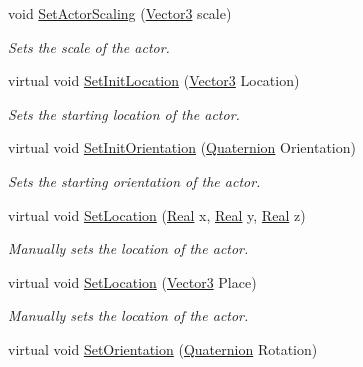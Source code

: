 \begin{DoxyCompactItemize}
void \hyperlink{classphys_1_1ActorSoft_ad1696a10b3057897ca503de013aaddc6}{SetActorScaling} (\hyperlink{classphys_1_1Vector3}{Vector3} scale)
\begin{DoxyCompactList}\small\item\em Sets the scale of the actor. \item\end{DoxyCompactList}\item 
virtual void \hyperlink{classphys_1_1ActorSoft_abbb6f5cce15d4efee91acd4825c75801}{SetInitLocation} (\hyperlink{classphys_1_1Vector3}{Vector3} Location)
\begin{DoxyCompactList}\small\item\em Sets the starting location of the actor. \item\end{DoxyCompactList}\item 
virtual void \hyperlink{classphys_1_1ActorSoft_adde8ecfb7188b8cbb238e88da18ac95e}{SetInitOrientation} (\hyperlink{classphys_1_1Quaternion}{Quaternion} Orientation)
\begin{DoxyCompactList}\small\item\em Sets the starting orientation of the actor. \item\end{DoxyCompactList}\item 
virtual void \hyperlink{classphys_1_1ActorSoft_a30ca5d4db06d9a81b5aff23faed4ee8d}{SetLocation} (\hyperlink{namespacephys_af7eb897198d265b8e868f45240230d5f}{Real} x, \hyperlink{namespacephys_af7eb897198d265b8e868f45240230d5f}{Real} y, \hyperlink{namespacephys_af7eb897198d265b8e868f45240230d5f}{Real} z)
\begin{DoxyCompactList}\small\item\em Manually sets the location of the actor. \item\end{DoxyCompactList}\item 
virtual void \hyperlink{classphys_1_1ActorSoft_a35020af183a31e288ff226a34fd1a0ab}{SetLocation} (\hyperlink{classphys_1_1Vector3}{Vector3} Place)
\begin{DoxyCompactList}\small\item\em Manually sets the location of the actor. \item\end{DoxyCompactList}\item 
virtual void \hyperlink{classphys_1_1ActorSoft_ad57b502da0658de31a4b3a9bb9be7900}{SetOrientation} (\hyperlink{classphys_1_1Quaternion}{Quaternion} Rotation)

\end{DoxyCompactItemize}
